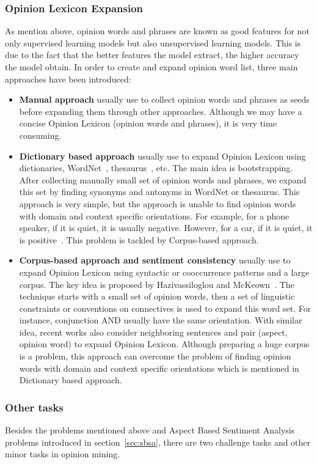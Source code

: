 \documentclass{article}
\begin{document}
\subsubsection{Opinion Lexicon Expansion}
As mention above, opinion words and phrases are known as good features for not only supervised learning models but also unsupervised learning models.
This is due to the fact that the better features the model extract, the higher accuracy the model obtain.
In order to create and expand opinion word list, three main approaches have been introduced:
\begin{itemize}
	\item \textbf{Manual approach} usually use to collect opinion words and phrases as seeds before expanding them through other approaches. Although we may have a concise Opinion Lexicon (opinion words and phrases), it is very time consuming.
	\item \textbf{Dictionary based approach} usually use to expand Opinion Lexicon using dictionaries, WordNet~\cite{Miller90wordnet:an}, thesaurus~\cite{Mohammad:2009:GHS:1699571.1699591}, etc.
		 The main idea is bootstrapping. 
		 After collecting manually small set of opinion words and phrases, we expand this set by finding synonyms and antonyms in WordNet or thesaurus. 
		 This approach is very simple, but the approach is unable to find opinion words with domain and context specific orientations. For example, for a  phone speaker, if it is quiet, it is usually negative. 
		 However, for a car, if it is quiet, it is positive~\cite{Liu2012}. This problem is tackled by Corpus-based approach.
	\item \textbf{Corpus-based approach and sentiment consistency} usually use to expand Opinion Lexicon using syntactic or cooccurrence patterns and a large corpus. 
		The key idea is proposed by Hazivassiloglou and McKeown~\cite{Hatzivassiloglou:1997:PSO:976909.979640}. 
		The technique starts with a small set of opinion words, then a set of linguistic constraints or conventions on connectives is used to expand this word set. 
		For instance, conjunction AND usually have the same orientation. 
		With similar idea, recent works also consider neighboring sentences and pair (aspect, opinion word) to expand Opinion Lexicon. 
		Although preparing a huge corpus is a problem, this approach can overcome the problem of finding opinion words with domain and context specific orientations which is mentioned in Dictionary based approach.
\end{itemize}

\subsubsection{Other tasks}
Besides the problems mentioned above and Aspect Based Sentiment Analysis problems introduced in section~\ref{sec:sbsa}, there are two challenge  tasks and other minor tasks in opinion mining.
\end{document}
